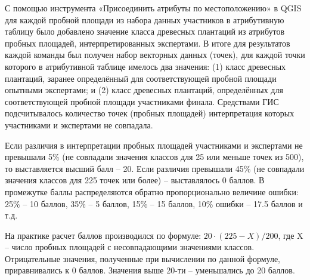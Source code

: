 С помощью инструмента «Присоединить атрибуты по местоположению» в QGIS для каждой пробной площади из набора данных участников в атрибутивную таблицу было добавлено значение класса древесных плантаций из атрибутов пробных площадей, интерпретированных экспертами.  В итоге для результатов каждой команды был получен набор векторных данных (точек), для каждой точки которого в атрибутивной таблице имелось два значения: (1) класс древесных плантаций, заранее определённый для соответствующей пробной площади опытными экспертами; и (2) класс древесных плантаций, определённых для соответствующей пробной площади участниками финала. Средствами ГИС подсчитывалось количество точек (пробных площадей) интерпретация которых участниками и экспертами не совпадала.

Если различия в интерпретации пробных площадей участниками и экспертами не превышали 5\% (не совпадали значения классов для 25 или меньше точек из 500), то выставляется высший балл – 20. Если различия превышали 45\% (не совпадали значения классов для 225 точек или более) – выставлялось 0 баллов. В промежутке баллы распределяются обратно пропорционально величине ошибки: 25\% – 10 баллов, 35\% – 5 баллов, 15\% – 15 баллов, 10\% ошибки – 17.5 баллов и т.д.

На практике расчет баллов производился по формуле: $20 \cdot (225-X)/200$, где X – число пробных площадей с несовпадающими значениями классов. Отрицательные значения, полученные при вычислении по данной формуле, приравнивались к 0 баллов. Значения выше 20-ти – уменьшались до 20 баллов.